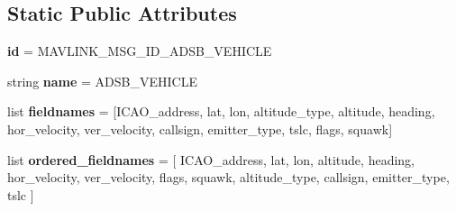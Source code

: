\subsection*{Static Public Attributes}
\begin{DoxyCompactItemize}
\item 
\mbox{\label{classpymavlink_1_1dialects_1_1v10_1_1MAVLink__adsb__vehicle__message_a87c3e807701ae9d4b443e6b1ca2559f3}} 
{\bfseries id} = M\+A\+V\+L\+I\+N\+K\+\_\+\+M\+S\+G\+\_\+\+I\+D\+\_\+\+A\+D\+S\+B\+\_\+\+V\+E\+H\+I\+C\+LE
\item 
\mbox{\label{classpymavlink_1_1dialects_1_1v10_1_1MAVLink__adsb__vehicle__message_a663b47836ebc4c96f8bd7c87dccf2dca}} 
string {\bfseries name} = \textquotesingle{}A\+D\+S\+B\+\_\+\+V\+E\+H\+I\+C\+LE\textquotesingle{}
\item 
\mbox{\label{classpymavlink_1_1dialects_1_1v10_1_1MAVLink__adsb__vehicle__message_a3198ce9805f251032d533e4ed79474d1}} 
list {\bfseries fieldnames} = \mbox{[}\textquotesingle{}I\+C\+A\+O\+\_\+address\textquotesingle{}, \textquotesingle{}lat\textquotesingle{}, \textquotesingle{}lon\textquotesingle{}, \textquotesingle{}altitude\+\_\+type\textquotesingle{}, \textquotesingle{}altitude\textquotesingle{}, \textquotesingle{}heading\textquotesingle{}, \textquotesingle{}hor\+\_\+velocity\textquotesingle{}, \textquotesingle{}ver\+\_\+velocity\textquotesingle{}, \textquotesingle{}callsign\textquotesingle{}, \textquotesingle{}emitter\+\_\+type\textquotesingle{}, \textquotesingle{}tslc\textquotesingle{}, \textquotesingle{}flags\textquotesingle{}, \textquotesingle{}squawk\textquotesingle{}\mbox{]}
\item 
\mbox{\label{classpymavlink_1_1dialects_1_1v10_1_1MAVLink__adsb__vehicle__message_a31eb6e4eae5c8b97617ee7d14b7e6ab1}} 
list {\bfseries ordered\+\_\+fieldnames} = \mbox{[} \textquotesingle{}I\+C\+A\+O\+\_\+address\textquotesingle{}, \textquotesingle{}lat\textquotesingle{}, \textquotesingle{}lon\textquotesingle{}, \textquotesingle{}altitude\textquotesingle{}, \textquotesingle{}heading\textquotesingle{}, \textquotesingle{}hor\+\_\+velocity\textquotesingle{}, \textquotesingle{}ver\+\_\+velocity\textquotesingle{}, \textquotesingle{}flags\textquotesingle{}, \textquotesingle{}squawk\textquotesingle{}, \textquotesingle{}altitude\+\_\+type\textquotesingle{}, \textquotesingle{}callsign\textquotesingle{}, \textquotesingle{}emitter\+\_\+type\textquotesingle{}, \textquotesingle{}tslc\textquotesingle{} \mbox{]}

\end{DoxyCompactItemize}
